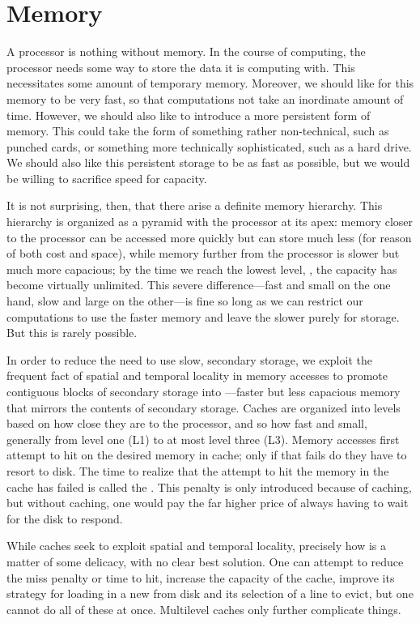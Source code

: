 \section{Memory}\label{background:computers:memory}
A processor is nothing without memory. In the course of computing, the processor needs some way to store the data it is computing with. This necessitates some amount of temporary memory. Moreover, we should like for this memory to be very fast, so that computations not take an inordinate amount of time. However, we should also like to introduce a more persistent form of memory. This could take the form of something rather non-technical, such as punched cards, or something more technically sophisticated, such as a hard drive. We should also like this persistent storage to be as fast as possible, but we would be willing to sacrifice speed for capacity.

It is not surprising, then, that there arise a definite memory hierarchy. This hierarchy is organized as a pyramid with the processor at its apex: memory closer to the processor can be accessed more quickly but can store much less (for reason of both cost and space), while memory further from the processor is slower but much more capacious; by the time we reach the lowest level, , the capacity has become virtually unlimited. This severe difference---fast and small on the one hand, slow and large on the other---is fine so long as we can restrict our computations to use the faster memory and leave the slower purely for storage. But this is rarely possible.

In order to reduce the need to use slow, secondary storage, we exploit the frequent fact of spatial and temporal locality in memory accesses to promote contiguous blocks of secondary storage into ---faster but less capacious memory that mirrors the contents of secondary storage. Caches are organized into levels based on how close they are to the processor, and so how fast and small, generally from level one (L1) to at most level three (L3). Memory accesses first attempt to hit on the desired memory in cache; only if that fails do they have to resort to disk. The time to realize that the attempt to hit the memory in the cache has failed is called the . This penalty is only introduced because of caching, but without caching, one would pay the far higher price of always having to wait for the disk to respond.

While caches seek to exploit spatial and temporal locality, precisely how is a matter of some delicacy, with no clear best solution. One can attempt to reduce the miss penalty or time to hit, increase the capacity of the cache, improve its strategy for loading in a new  from disk and its selection of a line to evict, but one cannot do all of these at once. Multilevel caches only further complicate things.

